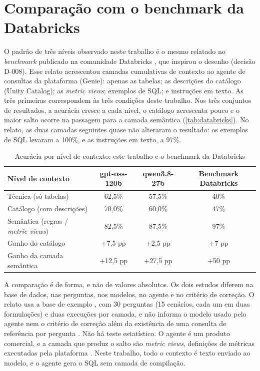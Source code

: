 \section{Comparação com o benchmark da Databricks}
\label{sec:databricks}

O padrão de três níveis observado neste trabalho é o mesmo relatado no
\textit{benchmark} publicado na comunidade Databricks
\cite{databricks2026genie}, que inspirou o desenho (decisão D-008). Esse
relato acrescentou camadas cumulativas de contexto ao agente de consultas
da plataforma (Genie): apenas as tabelas; as descrições do catálogo (Unity
Catalog); as \textit{metric views}; exemplos de SQL; e instruções em
texto. As três primeiras correspondem às três condições deste trabalho.
Nos três conjuntos de resultados, a acurácia cresce a cada nível, o
catálogo acrescenta pouco e o maior salto ocorre na passagem para a camada
semântica (\autoref{tab:databricks}). No relato, as duas camadas seguintes
quase não alteraram o resultado: os exemplos de SQL levaram a 100\%, e as
instruções em texto, a 97\%.

\begin{table}[htb]
  \centering
  \caption{Acurácia por nível de contexto: este trabalho e o benchmark da Databricks}
  \label{tab:databricks}
  \begin{tabular}{lccc}
    \toprule
    Nível de contexto & gpt-oss-120b & qwen3.8-27b & Benchmark Databricks \\
    \midrule
    Técnica (só tabelas)           & 62,5\% & 57,5\% & 40\% \\
    Catálogo (com descrições)      & 70,0\% & 60,0\% & 47\% \\
    Semântica (regras / \textit{metric views}) & 82,5\% & 87,5\% & 97\% \\
    \midrule
    Ganho do catálogo              & +7,5 pp & +2,5 pp & +7 pp \\
    Ganho da camada semântica      & +12,5 pp & +27,5 pp & +50 pp \\
    \bottomrule
  \end{tabular}
\end{table}

A comparação é de forma, e não de valores absolutos. Os dois estudos
diferem na base de dados, nas perguntas, nos modelos, no agente e no
critério de correção. O relato usa a base de exemplo
, com 30 perguntas (15 cenários, cada um em
duas formulações) e duas execuções por camada, e não informa o modelo
usado pelo agente nem o critério de correção além da existência de uma
consulta de referência por pergunta \cite{databricks2026genie}. Não há
teste estatístico. O agente é um produto comercial, e a camada que produz
o salto são \textit{metric views}, definições de métricas executadas pela
plataforma \cite{databricks_metricviews}. Neste trabalho, todo o contexto
é texto enviado ao modelo, e o agente gera o SQL sem camada de
compilação.

